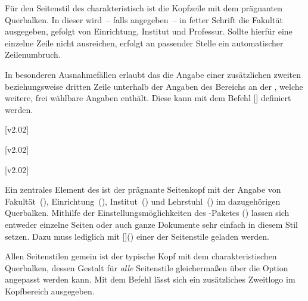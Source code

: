 \begin{DeclareEntity*}{}
\begin{DeclareEntity*}{}
\begin{DeclareEntity*}{}
\begin{Declaration}
\begin{Declaration}
\begin{Declaration}
\begin{Declaration}
\begin{Declaration}
Für den Seitenstil des \TUDCDs charakteristisch ist die Kopfzeile mit dem 
prägnanten Querbalken. In dieser wird~-- falls angegeben~-- in fetter Schrift 
die Fakultät ausgegeben, gefolgt von Einrichtung, Institut und Professur. 
Sollte hierfür eine einzelne Zeile nicht ausreichen, erfolgt an passender 
Stelle ein automatischer Zeilenumbruch.

In besonderen Ausnahmefällen erlaubt das \CD die Angabe einer zusätzlichen
zweiten beziehungsweise dritten Zeile unterhalb der Angaben des Bereichs an der 
\TnUD, welche weitere, frei wählbare Angaben enthält. Diese kann mit dem Befehl 
[] definiert werden.
\end{Declaration}
\end{Declaration}
\end{Declaration}
\end{Declaration}
\end{Declaration}
%
\begin{Declaration}
  {}
  [v2.02]
\begin{Declaration}
  {}
  [v2.02]
\begin{Declaration}
  {}
  [v2.02]

Ein zentrales Element des \TUDCDs ist der prägnante Seitenkopf mit der Angabe 
von Fakultät~(), Einrichtung~(), 
Institut~() und Lehrstuhl~() im dazugehörigen 
Querbalken. Mithilfe der Einstellungsmöglichkeiten des \KOMAScript-Paketes 
() lassen sich entweder einzelne 
Seiten oder auch ganze Dokumente sehr einfach in diesem Stil setzen. Dazu muss 
lediglich mit []() 
einer der Seitenstile geladen werden. 

%
Allen Seitenstilen gemein ist der typische Kopf mit dem charakteristischen 
Querbalken, dessen Gestalt für \emph{alle} Seitenstile gleichermaßen über die 
Option  angepasst werden kann. Mit dem Befehl  
lässt sich ein zusätzliches Zweitlogo im Kopfbereich ausgegeben.


\end{Declaration}
\end{Declaration}
\end{Declaration}
\end{DeclareEntity*}
\end{DeclareEntity*}
\end{DeclareEntity*}
